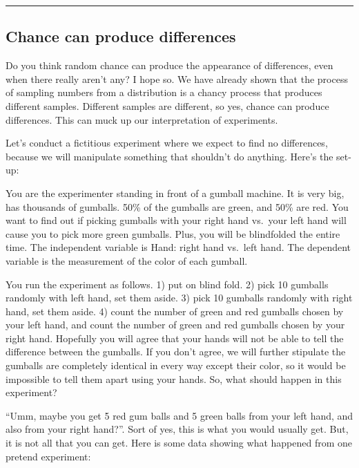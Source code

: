 \documentclass[
  letterpaper,
  DIV=11,
  numbers=noendperiod]{scrreprt}
\begin{document}
\begin{center}\rule{0.5\linewidth}{0.5pt}\end{center}

\subsection{Chance can produce
differences}\label{chance-can-produce-differences}

Do you think random chance can produce the appearance of differences,
even when there really aren't any? I hope so. We have already shown that
the process of sampling numbers from a distribution is a chancy process
that produces different samples. Different samples are different, so
yes, chance can produce differences. This can muck up our interpretation
of experiments.

Let's conduct a fictitious experiment where we expect to find no
differences, because we will manipulate something that shouldn't do
anything. Here's the set-up:

You are the experimenter standing in front of a gumball machine. It is
very big, has thousands of gumballs. 50\% of the gumballs are green, and
50\% are red. You want to find out if picking gumballs with your right
hand vs.~your left hand will cause you to pick more green gumballs.
Plus, you will be blindfolded the entire time. The independent variable
is Hand: right hand vs.~left hand. The dependent variable is the
measurement of the color of each gumball.

You run the experiment as follows. 1) put on blind fold. 2) pick 10
gumballs randomly with left hand, set them aside. 3) pick 10 gumballs
randomly with right hand, set them aside. 4) count the number of green
and red gumballs chosen by your left hand, and count the number of green
and red gumballs chosen by your right hand. Hopefully you will agree
that your hands will not be able to tell the difference between the
gumballs. If you don't agree, we will further stipulate the gumballs are
completely identical in every way except their color, so it would be
impossible to tell them apart using your hands. So, what should happen
in this experiment?

``Umm, maybe you get 5 red gum balls and 5 green balls from your left
hand, and also from your right hand?''. Sort of yes, this is what you
would usually get. But, it is not all that you can get. Here is some
data showing what happened from one pretend experiment:
\end{document}
